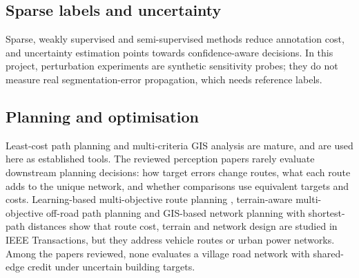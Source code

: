 \documentclass[12pt,a4paper]{report}
\begin{document}
\subsection{Sparse labels and uncertainty}
Sparse, weakly supervised and semi-supervised methods \cite{L23,L24,L31} reduce annotation cost, and uncertainty estimation \cite{L31} points towards confidence-aware decisions. In this project, perturbation experiments are synthetic sensitivity probes; they do not measure real segmentation-error propagation, which needs reference labels.

\subsection{Planning and optimisation}
Least-cost path planning \cite{F01,F02,F04} and multi-criteria GIS analysis \cite{F03} are mature, and are used here as established tools. The reviewed perception papers rarely evaluate downstream planning decisions: how target errors change routes, what each route adds to the unique network, and whether comparisons use equivalent targets and costs. Learning-based multi-objective route planning \cite{L40}, terrain-aware multi-objective off-road path planning \cite{L41} and GIS-based network planning with shortest-path distances \cite{L42} show that route cost, terrain and network design are studied in IEEE Transactions, but they address vehicle routes or urban power networks. Among the papers reviewed, none evaluates a village road network with shared-edge credit under uncertain building targets.
\end{document}
